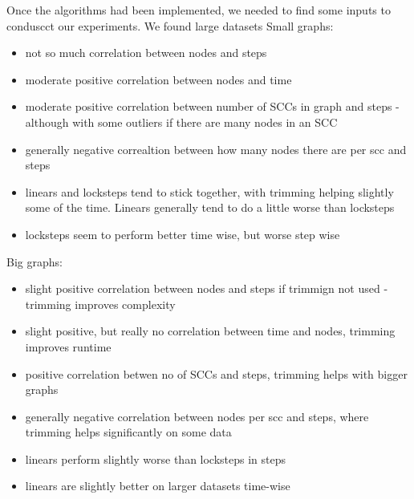 \documentclass[../master/master.tex]{subfiles}
\begin{document}
Once the algorithms had been implemented, we needed to find some inputs to conduscct our experiments. We found large datasets
Small graphs:
\begin{itemize}
\item not so much correlation between nodes and steps
\item moderate positive correlation between nodes and time
\item moderate positive correlation between number of SCCs in graph and steps - although with some outliers if there are many nodes in an SCC
\item generally negative correaltion between how many nodes there are per scc and steps
\item linears and locksteps tend to stick together, with trimming helping slightly some of the time. Linears generally tend to do a little worse than locksteps
\item locksteps seem to perform better time wise, but worse step wise
\end{itemize}
Big graphs:
\begin{itemize}
\item slight positive correlation between nodes and steps if trimmign not used - trimming improves complexity
\item slight positive, but really no correlation between time and nodes, trimming improves runtime
\item positive correlation betwen no of SCCs and steps, trimming helps with bigger graphs
\item generally negative correlation between nodes per scc and steps, where trimming helps significantly on some data
\item linears perform slightly worse than locksteps in steps
\item linears are slightly better on larger datasets time-wise
\end{itemize}
\end{document}
